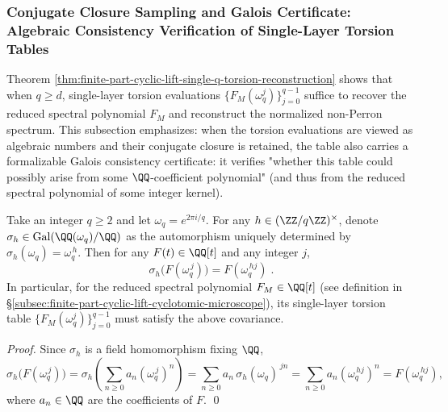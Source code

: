 \subsubsection{Conjugate Closure Sampling and Galois Certificate: Algebraic Consistency Verification of Single-Layer Torsion Tables}\label{subsubsec:finite-part-single-layer-torsion-galois-certificate}
Theorem \ref{thm:finite-part-cyclic-lift-single-q-torsion-reconstruction} shows that when \(q\ge d\), single-layer torsion evaluations \(\{F_M(\omega_q^j)\}_{j=0}^{q-1}\) suffice to recover the reduced spectral polynomial \(F_M\) and reconstruct the normalized non-Perron spectrum.
This subsection emphasizes: when the torsion evaluations are viewed as algebraic numbers and their conjugate closure is retained, the table also carries a formalizable Galois consistency certificate: it verifies "whether this table could possibly arise from some \(\QQ\)-coefficient polynomial" (and thus from the reduced spectral polynomial of some integer kernel).

\begin{proposition}\label{prop:finite-part-torsion-table-galois-covariance}
Take an integer \(q\ge2\) and let \(\omega_q=e^{2\pi i/q}\).
For any \(h\in(\ZZ/q\ZZ)^\times\), denote \(\sigma_h\in\mathrm{Gal}(\QQ(\omega_q)/\QQ)\) as the automorphism uniquely determined by \(\sigma_h(\omega_q)=\omega_q^{\,h}\).
Then for any \(F(t)\in\QQ[t]\) and any integer \(j\),
\[
\boxed{\;\sigma_h\!\bigl(F(\omega_q^{\,j})\bigr)=F(\omega_q^{\,hj})\; }.
\]
In particular, for the reduced spectral polynomial \(F_M\in\QQ[t]\) (see definition in \S\ref{subsec:finite-part-cyclic-lift-cyclotomic-microscope}), its single-layer torsion table \(\{F_M(\omega_q^j)\}_{j=0}^{q-1}\) must satisfy the above covariance.
\end{proposition}
\begin{proof}
Since \(\sigma_h\) is a field homomorphism fixing \(\QQ\),
\[
\sigma_h\!\bigl(F(\omega_q^{\,j})\bigr)
=\sigma_h\!\left(\sum_{n\ge0}a_n(\omega_q^{\,j})^n\right)
=\sum_{n\ge0}a_n\,\sigma_h(\omega_q)^{\,jn}
=\sum_{n\ge0}a_n(\omega_q^{\,hj})^n
=F(\omega_q^{\,hj}),
\]
where \(a_n\in\QQ\) are the coefficients of \(F\). \qed
\end{proof}

